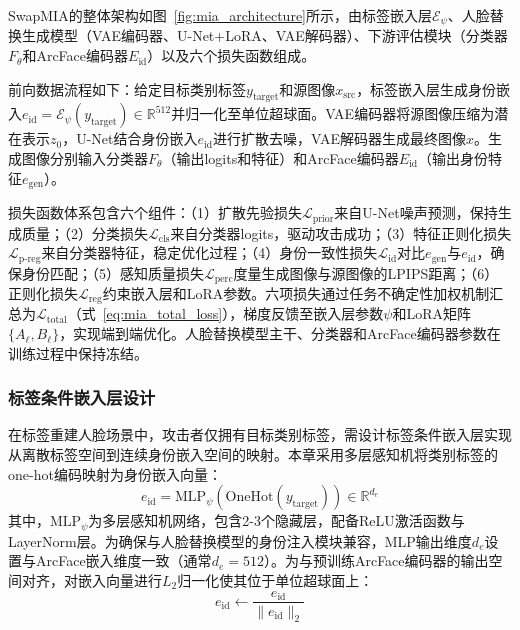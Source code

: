 SwapMIA的整体架构如图~\ref{fig:mia_architecture}所示，由标签嵌入层$\mathcal{E}_\psi$、人脸替换生成模型（VAE编码器、U-Net+LoRA、VAE解码器）、下游评估模块（分类器$F_\theta$和ArcFace编码器$E_{\text{id}}$）以及六个损失函数组成。

前向数据流程如下：给定目标类别标签$y_{\text{target}}$和源图像$x_{\text{src}}$，标签嵌入层生成身份嵌入$e_{\text{id}}=\mathcal{E}_\psi(y_{\text{target}})\in\mathbb{R}^{512}$并归一化至单位超球面。VAE编码器将源图像压缩为潜在表示$z_0$，U-Net结合身份嵌入$e_{\text{id}}$进行扩散去噪，VAE解码器生成最终图像$\hat{x}$。生成图像分别输入分类器$F_\theta$（输出logits和特征）和ArcFace编码器$E_{\text{id}}$（输出身份特征$e_{\text{gen}}$）。

损失函数体系包含六个组件：（1）扩散先验损失$\mathcal{L}_{\text{prior}}$来自U-Net噪声预测，保持生成质量；（2）分类损失$\mathcal{L}_{\text{cls}}$来自分类器logits，驱动攻击成功；（3）特征正则化损失$\mathcal{L}_{\text{p-reg}}$来自分类器特征，稳定优化过程；（4）身份一致性损失$\mathcal{L}_{\text{id}}$对比$e_{\text{gen}}$与$e_{\text{id}}$，确保身份匹配；（5）感知质量损失$\mathcal{L}_{\text{perc}}$度量生成图像与源图像的LPIPS距离；（6）正则化损失$\mathcal{L}_{\text{reg}}$约束嵌入层和LoRA参数。六项损失通过任务不确定性加权机制汇总为$\mathcal{L}_{\text{total}}$（式~\ref{eq:mia_total_loss}），梯度反馈至嵌入层参数$\psi$和LoRA矩阵$\{A_\ell, B_\ell\}$，实现端到端优化。人脸替换模型主干、分类器和ArcFace编码器参数在训练过程中保持冻结。



\subsubsection{标签条件嵌入层设计}

在标签重建人脸场景中，攻击者仅拥有目标类别标签，需设计标签条件嵌入层实现从离散标签空间到连续身份嵌入空间的映射。本章采用多层感知机将类别标签的one-hot编码映射为身份嵌入向量：
\begin{equation}\label{eq:mia_mlp_emb}
    e_{\text{id}} = \text{MLP}_{\psi}(\text{OneHot}(y_{\text{target}})) \in \mathbb{R}^{d_e}
\end{equation}
其中，$\text{MLP}_{\psi}$为多层感知机网络，包含2-3个隐藏层，配备ReLU激活函数与LayerNorm层。为确保与人脸替换模型的身份注入模块兼容，MLP输出维度$d_e$设置与ArcFace嵌入维度一致（通常$d_e=512$）。为与预训练ArcFace编码器的输出空间对齐，对嵌入向量进行$L_2$归一化使其位于单位超球面上：
\begin{equation}\label{eq:mia_emb_norm}
    e_{\text{id}} \leftarrow \frac{e_{\text{id}}}{\|e_{\text{id}}\|_2}
\end{equation}

